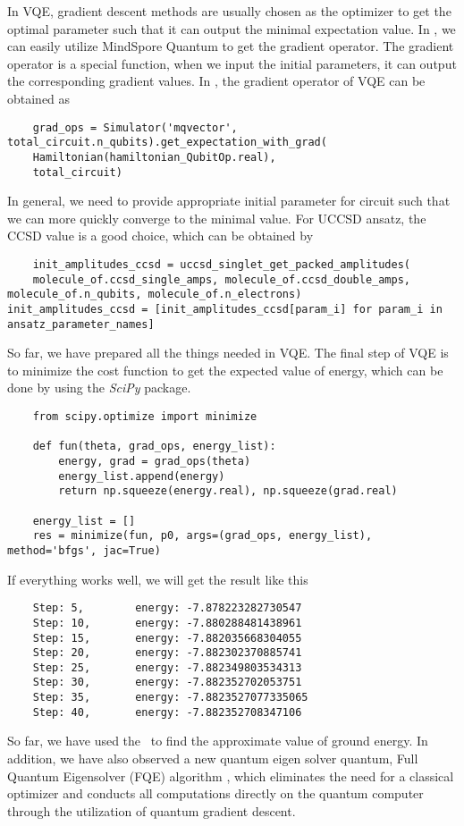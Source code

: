 In VQE, gradient descent methods are usually chosen as the optimizer to get the optimal parameter such that it can output the minimal expectation value.
In \MindQuantum, we can easily utilize MindSpore Quantum to get the gradient operator.
The gradient operator is a special function, when we input the initial parameters, it can output the corresponding gradient values.
In \MindQuantum, the gradient operator of VQE can be obtained as
\begin{lstlisting}
    grad_ops = Simulator('mqvector', total_circuit.n_qubits).get_expectation_with_grad(
    Hamiltonian(hamiltonian_QubitOp.real),
    total_circuit)
\end{lstlisting}
In general, we need to provide appropriate initial parameter for circuit such that we can more quickly converge to the minimal value. For UCCSD ansatz, the CCSD value is a good choice, which can be obtained by
\begin{lstlisting}
    init_amplitudes_ccsd = uccsd_singlet_get_packed_amplitudes(
    molecule_of.ccsd_single_amps, molecule_of.ccsd_double_amps, molecule_of.n_qubits, molecule_of.n_electrons)
init_amplitudes_ccsd = [init_amplitudes_ccsd[param_i] for param_i in ansatz_parameter_names]
\end{lstlisting}
So far, we have prepared all the things needed in VQE.
The final step of VQE is to minimize the cost function to get the expected value of energy, which can be done by using the \textit{SciPy} package.
\begin{lstlisting}
    from scipy.optimize import minimize

    def fun(theta, grad_ops, energy_list):
        energy, grad = grad_ops(theta)
        energy_list.append(energy)
        return np.squeeze(energy.real), np.squeeze(grad.real)

    energy_list = []
    res = minimize(fun, p0, args=(grad_ops, energy_list), method='bfgs', jac=True)
\end{lstlisting}
If everything works well, we will get the result like this
\begin{lstlisting}
    Step: 5,        energy: -7.878223282730547
    Step: 10,       energy: -7.880288481438961
    Step: 15,       energy: -7.882035668304055
    Step: 20,       energy: -7.882302370885741
    Step: 25,       energy: -7.882349803534313
    Step: 30,       energy: -7.882352702053751
    Step: 35,       energy: -7.8823527077335065
    Step: 40,       energy: -7.882352708347106
\end{lstlisting}
So far, we have used the \MindQuantum\ to find the approximate value of ground energy. In addition, we have also observed a new quantum eigen solver quantum, Full Quantum Eigensolver (FQE) algorithm \cite{wei2020full}, which eliminates the need for a classical optimizer and conducts all computations directly on the quantum computer through the utilization of quantum gradient descent.
